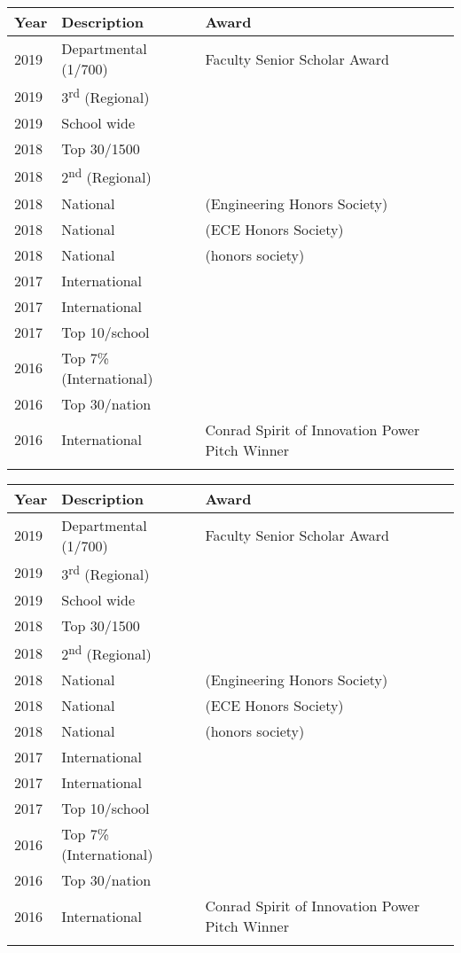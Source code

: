 \newcommand{\awardscontent}{%
	\textbf{Year}        &
	\textbf{Description} &
	\textbf{Award}                                                                                                \\
	\midrule
	\awardshigh{}2019    & Departmental (1/700)             & Faculty Senior Scholar Award                        \\
	\awardslow{}2019     & 3\textsuperscript{rd} (Regional) & \ieeeweb{IEEE Website Design Competition}           \\
	\awardslow{}2019     & School wide                      & \fintech{Carolina FinTech University Winner}        \\
	\awardshigh{}2018    & Top 30/1500                      & \nba{NBA Hackathon Finalist}                        \\
	\awardshigh{}2018    & 2\textsuperscript{nd} (Regional) & \ieeehacks{IEEE SouthEastCon Hackathon}             \\
	\awardslow{}2018     & National                         & \tbp{Tau Beta Pi} (Engineering Honors Society)      \\
	\awardslmedium{}2018 & National                         & \hkn{IEEE Eta Kappa Nu} (ECE Honors Society)        \\
	\awardslow{}2018     & National                         & \pkp{Phi Kappa Phi} (honors society)                \\
	\awardshigh{}2017    & International                    & \first{\acr{FIRST} Robotics World Quarter Finalist} \\
	\awardshigh{}2017    & International                    & \ibm{IBM Watson Scholar}                            \\
	\awardslow{}2017     & Top 10/school                    & \bbs{Bowman Brockman Endowded Scholar}              \\
	\awardshigh{}2016    & Top 7\% (International)          & \himcm{HiMCM Finalist}                              \\
	\awardshigh{}2016    & Top 30/nation                    & \beaver{MIT Beaverworks Robotics Institute}         \\
	\awardslow{}2016     & International                    & Conrad Spirit of Innovation Power Pitch Winner      \\
}

\makeatletter%
\if@twocolumn%
	\renewcommand{\arraystretch}{1.1}
	\begin{table}[h!]
		\small
		\begin{tabularx}{\columnwidth}{l l p{5.2cm}}
			\awardscontent{}
		\end{tabularx}
	\end{table}
\else%
	\begin{table}[h!]
		\begin{tabular}{lll}
			\awardscontent{}
		\end{tabular}
	\end{table}
	\FloatBarrier%
\fi
\makeatother

